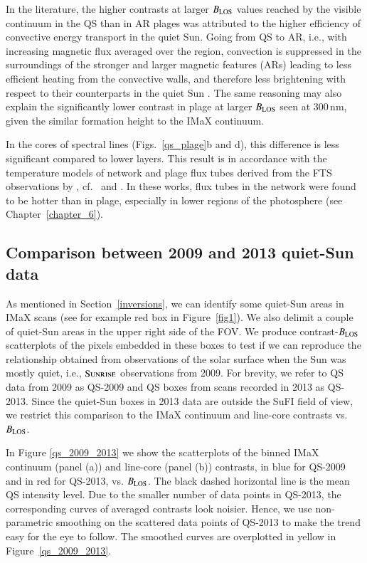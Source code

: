 \documentclass[goettingen, gauss, print]{thesis}
\begin{document}
In the literature, the higher contrasts at larger $B_{\rm LOS}$ values reached by the visible continuum in the QS than in AR plages was attributed to the higher efficiency of convective energy transport in the quiet Sun. Going from QS to AR, i.e., with increasing magnetic flux averaged over the region, convection is suppressed in the surroundings of the stronger and larger magnetic features (ARs) leading to less efficient heating from the convective walls, and therefore less brightening with respect to their counterparts in the quiet Sun \citep[]{vogler_effect_2005,morinaga_suppression_2008,kobel_continuum_2012,criscuoli_comparison_2013,riethmuller_comparison_2014}.
The same reasoning may also explain the significantly lower contrast in plage at larger $B_{\rm LOS}$ seen at 300\,nm, given the similar formation height to the IMaX continuum.

In the cores of spectral lines (Figs.~\ref{qs_plage}b and d), this difference is less significant compared to lower layers. This result is in accordance with the temperature models of network and plage flux tubes derived from the FTS observations by \cite{solanki_solar_1996}, cf.~\cite{solanki_photospheric_1987} and \cite{solanki_continuum_1992}. In these works, flux tubes in the network were found to be hotter than in plage, especially in lower regions of the photosphere (see Chapter~\ref{chapter_6}).
\subsection{Comparison between 2009 and 2013 quiet-Sun data}
\label{QS_2009_2013}

As mentioned in Section~\ref{inversions}, we can identify some quiet-Sun areas in IMaX scans (see for example red box in Figure~\ref{fig1}). We also delimit a couple of quiet-Sun areas in the upper right side of the FOV. We produce contrast-$B_{\rm LOS}$ scatterplots of the pixels embedded in these boxes to test if we can reproduce the relationship obtained from observations of the solar surface when the Sun was mostly quiet, i.e., $\textsc{Sunrise}$ observations from 2009. For brevity, we refer to QS data from 2009 as QS-2009 and QS boxes from scans recorded in 2013 as QS-2013. Since the quiet-Sun boxes in 2013 data are outside the SuFI field of view, we restrict this comparison to the IMaX continuum and line-core contrasts vs. $B_{\rm LOS}$.

In Figure \ref{qs_2009_2013} we show the scatterplots of the binned IMaX continuum (panel (a)) and line-core (panel (b)) contrasts, in blue for QS-2009 and in red for QS-2013, vs. $B_{\rm LOS}$. The black dashed horizontal line is the mean QS intensity level. Due to the smaller number of data points in QS-2013, the corresponding curves of averaged contrasts look noisier. Hence, we use non-parametric smoothing on the scattered data points of QS-2013 to make the trend easy for the eye to follow. The smoothed curves are overplotted in yellow in Figure~\ref{qs_2009_2013}.
\end{document}
